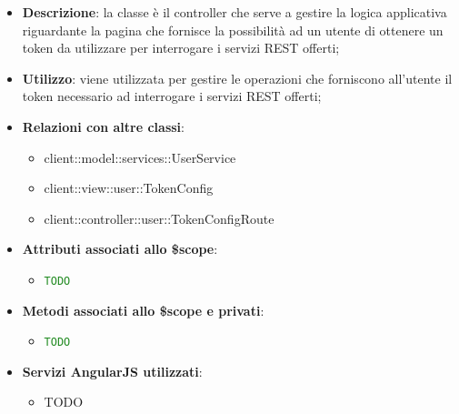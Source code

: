 			\begin{itemize}
				\item \textbf{Descrizione}: la classe è il controller che serve a gestire la logica applicativa riguardante la pagina che fornisce la possibilità ad un utente di ottenere un token da utilizzare per interrogare i servizi REST offerti;
				\item \textbf{Utilizzo}: viene utilizzata per gestire le operazioni che forniscono all'utente il token necessario ad interrogare i servizi REST offerti;
				\item \textbf{Relazioni con altre classi}:
					\begin{itemize}
						\item client::model::services::UserService
						\item client::view::user::TokenConfig
						\item client::controller::user::TokenConfigRoute
					\end{itemize}

				\item \textbf{Attributi associati allo \$scope}:
					\begin{itemize}
						\item \textcolor{forestgreen}{\texttt{TODO}}

					\end{itemize}

				\item \textbf{Metodi associati allo \$scope e privati}:
					\begin{itemize}
						\item \textcolor{forestgreen}{\texttt{TODO}}

					\end{itemize}

				\item \textbf{Servizi AngularJS utilizzati}:
					\begin{itemize}
						\item TODO
					\end{itemize}

			\end{itemize}

